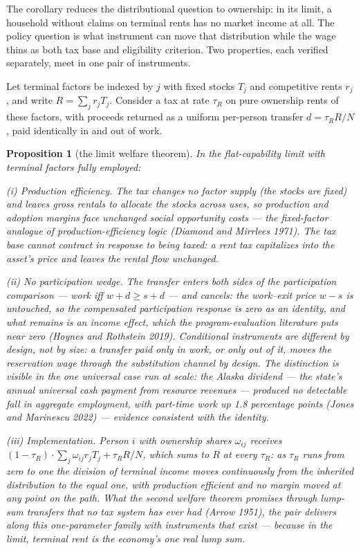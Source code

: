 \documentclass[12pt]{article}
\theoremstyle{plain}
\newtheorem{proposition}{Proposition}
\begin{document}
The corollary reduces the distributional question to ownership: in its limit, a household without claims on terminal rents has no market income at all. The policy question is what instrument can move that distribution while the wage thins as both tax base and eligibility criterion. Two properties, each verified separately, meet in one pair of instruments.

Let terminal factors be indexed by $j$ with fixed stocks $T_j$ and competitive rents $r_j$, and write $R = \sum _j r_j T_j$. Consider a tax at rate $\tau _R$ on pure ownership rents of these factors, with proceeds returned as a uniform per-person transfer $d = \tau _R R/N$, paid identically in and out of work.

\begin{proposition}[the limit welfare theorem]\label{prop:welfare}
In the flat-capability limit with terminal factors fully employed:

(i) \emph{Production efficiency.} The tax changes no factor supply (the stocks are fixed) and leaves gross rentals to allocate the stocks across uses, so production and adoption margins face unchanged social opportunity costs --- the fixed-factor analogue of production-efficiency logic (Diamond and Mirrlees 1971). The tax base cannot contract in response to being taxed: a rent tax capitalizes into the asset's price and leaves the rental flow unchanged.

(ii) \emph{No participation wedge.} The transfer enters both sides of the participation comparison --- work iff $w + d \ge s + d$ --- and cancels: the work--exit price $w - s$ is untouched, so the compensated participation response is zero as an identity, and what remains is an income effect, which the program-evaluation literature puts near zero (Hoynes and Rothstein 2019). Conditional instruments are different by design, not by size: a transfer paid only in work, or only out of it, moves the reservation wage through the substitution channel by design. The distinction is visible in the one universal case run at scale: the Alaska dividend --- the state's annual universal cash payment from resource revenues --- produced no detectable fall in aggregate employment, with part-time work up 1.8 percentage points (Jones and Marinescu 2022) --- evidence consistent with the identity.

(iii) \emph{Implementation.} Person $i$ with ownership shares $\omega _{ij}$ receives $(1-\tau _R)\cdot \sum _j\omega _{ij}r_j T_j + \tau _R R/N$, which sums to $R$ at every $\tau _R$: as $\tau _R$ runs from zero to one the division of terminal income moves continuously from the inherited distribution to the equal one, with production efficient and no margin moved at any point on the path. What the second welfare theorem promises through lump-sum transfers that no tax system has ever had (Arrow 1951), the pair delivers along this one-parameter family with instruments that exist --- because in the limit, terminal rent is the economy's one real lump sum.
\end{proposition}
\end{document}
